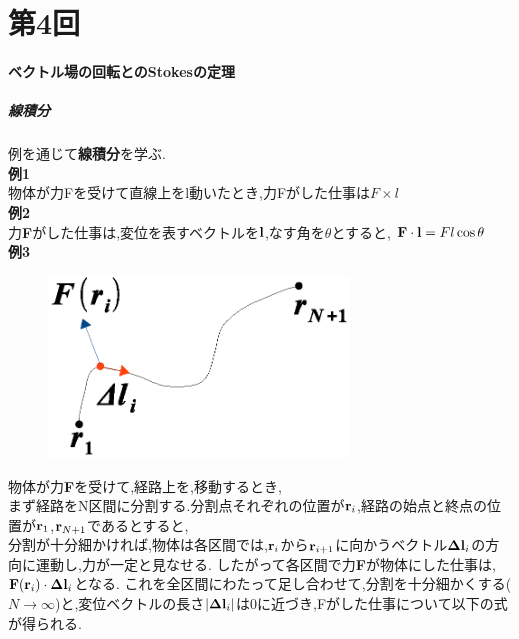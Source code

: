 \documentclass[../main]{subfiles}
\begin{document}
\clearpage

\setcounter{eqnarray}{0}
\setcounter{equation}{0}
\setcounter{figure}{0}

\part*{第4回}

\subsection{ベクトル場の回転とのStokesの定理}
\subsubsection{線積分}
例を通じて{\bf 線積分}を学ぶ.\\

{\bf 例1}\\
物体が力Fを受けて直線上をl動いたとき,力Fがした仕事は$F \times l$ \\

{\bf 例2}\\
力{\bf F}がした仕事は,変位を表すベクトルを${\bf l}$,なす角を$\theta$とすると,
${\bf F} \cdot {\bf l}=Fl \cos \theta$ \\

{\bf 例3}\\
\begin{figure}[htbp]
 \begin{center}
  \includegraphics[width=80mm]{4.1.eps}
 \end{center}
 \caption{}
 \label{fig:one}
\end{figure}
物体が力{\bf F}を受けて,経路上を,移動するとき,\\
まず経路をN区間に分割する.分割点それぞれの位置が${\bf r}_i$,経路の始点と終点の位置が${\bf r}_1$,${\bf r}_{N+1}$であるとすると, \\
分割が十分細かければ,物体は各区間では,${\bf r}_i$から${\bf r}_{i+1}$に向かうベクトル${\bf \Delta l}_i$の方向に運動し,力が一定と見なせる.
したがって各区間で力{\bf F}が物体にした仕事は,${\bf F}({\bf r}_i) \cdot {\bf \Delta l}_i$となる.
これを全区間にわたって足し合わせて,分割を十分細かくする($N \to \infty$)と,変位ベクトルの長さ$|{\bf \Delta l}_i|$は0に近づき,Fがした仕事について以下の式が得られる.
\end{document}

